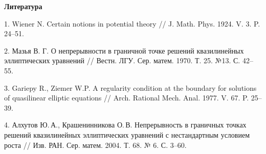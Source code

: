 \begin{center}
{\bf Литература}
\end{center}

1. Wiener N. Certain notions in potential theory // J. Math. Phys. 1924. V. 3. P. 24--51.


2. Мазья В. Г. О непрерывности в граничной точке решений квазилинейных эллиптических
уравнений // Вестн. ЛГУ. Сер. матем. 1970. Т. 25. №13. С. 42--55.


3. Gariepy R., Ziemer W.P. A regularity condition at the boundary for solutions of quasilinear
elliptic equations // Arch. Rational Mech. Anal. 1977. V. 67. P. 25--39.


4. Алхутов Ю.\,А., Крашенинникова О.\,В.
Непрерывность в граничных точках решений квазилинейных эл\-ли\-п\-ти\-че\-с\-ких уравнений с нестандартным условием роста
//
Изв.
\linebreak
РАН. Сер. матем. 2004. Т. 68. № 6. С. 3–60.
